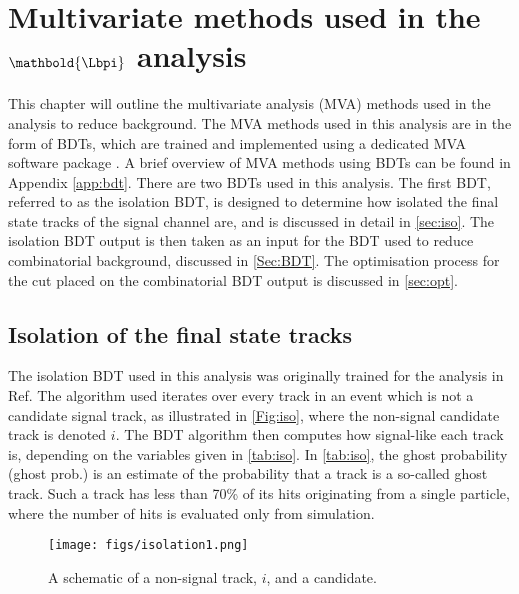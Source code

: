 \chapter{Multivariate methods used in the $\mathbold{\Lbpi}$ analysis}
\label{chap:bdt}
This chapter will outline the multivariate analysis (MVA) methods used in the \Lbpi analysis to reduce background. The MVA methods used in this analysis are in the form of BDTs, which are trained and implemented using a dedicated MVA software package \cite{TMVA}. A brief overview of MVA methods using BDTs can be found in Appendix \ref{app:bdt}. There are two BDTs used in this analysis. The first BDT, referred to as the isolation BDT, is designed to determine how isolated the final state tracks of the signal channel are, and is discussed in detail in \autoref{sec:iso}. The isolation BDT output is then taken as an input for the BDT used to reduce combinatorial background, discussed in \autoref{Sec:BDT}. The optimisation process for the cut placed on the combinatorial BDT output is discussed in \autoref{sec:opt}.

\section{Isolation of the final state tracks}
\label{sec:iso}
The isolation BDT used in this analysis was originally trained for the analysis in Ref\cite{LHCB-ANA-2014-048}. The algorithm used iterates over every track in an event which is not a candidate signal track, as illustrated in \autoref{Fig:iso}, where the non-signal candidate track is denoted $i$. The BDT algorithm then computes how signal-like each track is, depending on the variables given in \autoref{tab:iso}. In \autoref{tab:iso}, the ghost probability (ghost prob.) is an estimate of the probability that a track is a so-called \gls{ghost} track. Such a track has less than 70\% of its hits originating from a single particle, where the number of hits is evaluated only from simulation. %

\begin{figure}[ht!]
    \centering
  \texttt{[image: figs/isolation1.png]}
  \caption{A schematic of a non-signal track, $i$, and a \Lbpi candidate.}
    \label{Fig:iso}
\end{figure}


